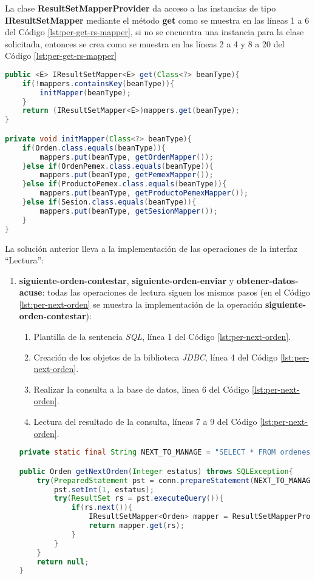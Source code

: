 La clase \textbf{ResultSetMapperProvider} da acceso a las instancias de tipo \textbf{IResultSetMapper} mediante el método \textbf{get} como se muestra en las líneas 1 a 6 del Código \ref{lst:per-get-rs-mapper}, si no se encuentra una instancia para la clase solicitada, entonces se crea como se muestra en las líneas 2 a 4 y 8 a 20 del Código \ref{lst:per-get-rs-mapper}
\begin{lstlisting}[language=Java, caption={Obtención de instancias de IResultSetMapper.}, captionpos=b, label={lst:per-get-rs-mapper}]
public <E> IResultSetMapper<E> get(Class<?> beanType){
	if(!mappers.containsKey(beanType)){
		initMapper(beanType);
	}
	return (IResultSetMapper<E>)mappers.get(beanType);
}

private void initMapper(Class<?> beanType){
	if(Orden.class.equals(beanType)){
		mappers.put(beanType, getOrdenMapper());
	}else if(OrdenPemex.class.equals(beanType)){
		mappers.put(beanType, getPemexMapper());
	}else if(ProductoPemex.class.equals(beanType)){
		mappers.put(beanType, getProductoPemexMapper());
	}else if(Sesion.class.equals(beanType)){
		mappers.put(beanType, getSesionMapper());
	}
}
\end{lstlisting}

La solución anterior lleva a la implementación de las operaciones de la interfaz ``Lectura'':
\begin{enumerate}
	\item \textbf{siguiente-orden-contestar}, \textbf{siguiente-orden-enviar} y \textbf{obtener-datos-acuse}: todas las operaciones de lectura siguen los mismos pasos (en el Código \ref{lst:per-next-orden} se muestra la implementación de la operación \textbf{siguiente-orden-contestar}):
	\begin{enumerate}
		\item Plantilla de la sentencia \textit{SQL}, línea 1 del Código \ref{lst:per-next-orden}.
		\item Creación de los objetos de la biblioteca \textit{JDBC}, línea 4 del Código \ref{lst:per-next-orden}.
		\item Realizar la consulta a la base de datos, línea 6 del Código \ref{lst:per-next-orden}.
		\item Lectura del resultado de la consulta, líneas 7 a 9 del Código \ref{lst:per-next-orden}.
	\end{enumerate}

	\begin{lstlisting}[language=Java, caption={Lectura de una orden de reposición desde la base de datos.}, captionpos=b, label={lst:per-next-orden}]
private static final String NEXT_TO_MANAGE = "SELECT * FROM ordenes WHERE estatus = ? ORDER BY fecha_insersion LIMIT 1";

public Orden getNextOrden(Integer estatus) throws SQLException{
	try(PreparedStatement pst = conn.prepareStatement(NEXT_TO_MANAGE)){
		pst.setInt(1, estatus);
		try(ResultSet rs = pst.executeQuery()){
    		if(rs.next()){
    			IResultSetMapper<Orden> mapper = ResultSetMapperProvider.getInstance().get(Orden.class);
    			return mapper.get(rs);
    		}
		}
	}
	return null;
}
	\end{lstlisting}
\end{enumerate}

